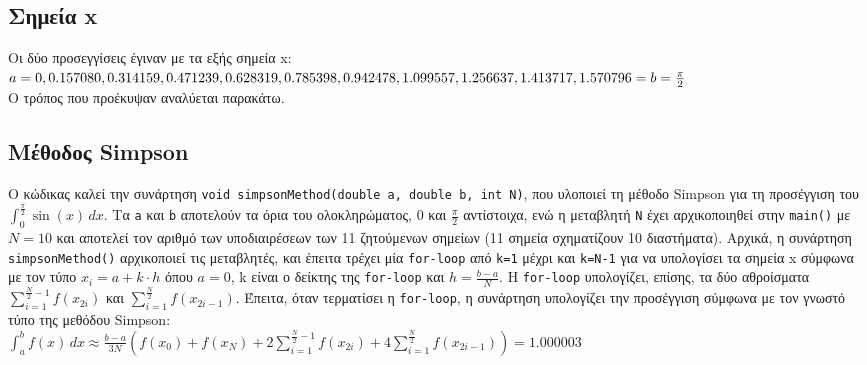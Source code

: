 \documentclass[a4paper, 14pt]{article}   %
\begin{document}
\subsection*{Σημεία x}   %
	Οι δύο προσεγγίσεις έγιναν με τα εξής σημεία x:\\
$a = 0, 0.157080, 0.314159, 0.471239, 0.628319, 0.785398,\\ 0.942478, 1.099557, 1.256637, 1.413717, 1.570796 = b = \frac{\pi}{2}$\\
Ο τρόπος που προέκυψαν αναλύεται παρακάτω.

\subsection*{Μέθοδος Simpson}  %
	Ο κώδικας καλεί την συνάρτηση \texttt{void simpsonMethod(double a, double b, int N)}, που υλοποιεί τη μέθοδο Simpson για τη προσέγγιση του $\int_{0}^{\frac{\pi}{2}} \sin(x) \,dx$. Τα  \texttt{a} και \texttt{b} αποτελούν τα όρια του ολοκληρώματος, 0 και $\frac{\pi}{2}$ αντίστοιχα, ενώ η μεταβλητή \texttt{N} έχει αρχικοποιηθεί στην \texttt{main()} με $N=10$ και αποτελεί τον αριθμό των υποδιαιρέσεων των 11 ζητούμενων σημείων (11 σημεία σχηματίζουν 10 διαστήματα). Αρχικά, η συνάρτηση \texttt{simpsonMethod()} αρχικοποιεί τις μεταβλητές, και έπειτα τρέχει μία \texttt{for-loop} από \texttt{k=1} μέχρι και \texttt{k=N-1} για να υπολογίσει τα σημεία x σύμφωνα με τον τύπο $x_i = a + k \cdot h$ όπου $a=0$, k είναι ο δείκτης της \texttt{for-loop} και $h = \frac{b-a}{N}$. Η \texttt{for-loop} υπολογίζει, επίσης, τα δύο αθροίσματα $ \displaystyle\sum_{i=1}^{\frac{N}{2}-1} f(x_{2i})$ και $\displaystyle\sum_{i=1}^{\frac{N}{2}} f(x_{2i-1})$. Έπειτα, όταν τερματίσει η \texttt{for-loop}, η συνάρτηση υπολογίζει την προσέγγιση σύμφωνα με τον γνωστό τύπο της μεθόδου Simpson:\\$\displaystyle \int_{a}^{b} f(x) \,dx \approx \frac{b-a}{3N}(f(x_0) + f(x_N) + 2\sum_{i=1}^{\frac{N}{2}-1} f(x_{2i}) + 4\sum_{i=1}^{\frac{N}{2}} f(x_{2i-1})) = 1.000003$
\end{document}

